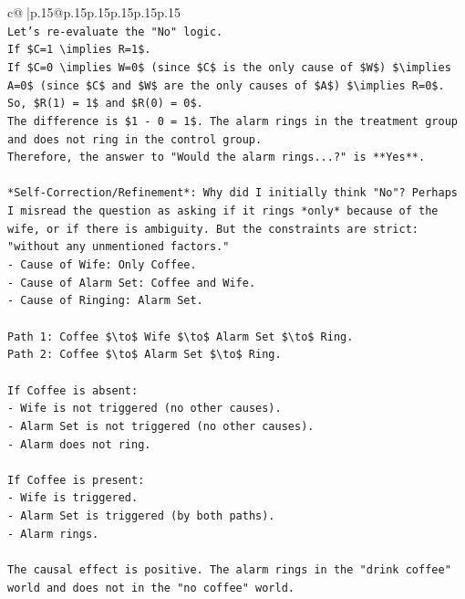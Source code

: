 \documentclass{article}
\begin{document}
{\begin{supertabular}{c@{$\;$}|p{.15\linewidth}@{}p{.15\linewidth}p{.15\linewidth}p{.15\linewidth}p{.15\linewidth}p{.15\linewidth}}
{{{\\ 
\texttt{Let's re{-}evaluate the "No" logic.} \\
\texttt{If \$C=1 \textbackslash{}implies R=1\$.} \\
\texttt{If \$C=0 \textbackslash{}implies W=0\$ (since \$C\$ is the only cause of \$W\$) \$\textbackslash{}implies A=0\$ (since \$C\$ and \$W\$ are the only causes of \$A\$) \$\textbackslash{}implies R=0\$.} \\
\texttt{So, \$R(1) = 1\$ and \$R(0) = 0\$.} \\
\texttt{The difference is \$1 {-} 0 = 1\$. The alarm rings in the treatment group and does not ring in the control group.} \\
\texttt{Therefore, the answer to "Would the alarm rings...?" is **Yes**.} \\
\\ 
\texttt{*Self{-}Correction/Refinement*: Why did I initially think "No"? Perhaps I misread the question as asking if it rings *only* because of the wife, or if there is ambiguity. But the constraints are strict: "without any unmentioned factors."} \\
\texttt{{-} Cause of Wife: Only Coffee.} \\
\texttt{{-} Cause of Alarm Set: Coffee and Wife.} \\
\texttt{{-} Cause of Ringing: Alarm Set.} \\
\\ 
\texttt{Path 1: Coffee \$\textbackslash{}to\$ Wife \$\textbackslash{}to\$ Alarm Set \$\textbackslash{}to\$ Ring.} \\
\texttt{Path 2: Coffee \$\textbackslash{}to\$ Alarm Set \$\textbackslash{}to\$ Ring.} \\
\\ 
\texttt{If Coffee is absent:} \\
\texttt{{-} Wife is not triggered (no other causes).} \\
\texttt{{-} Alarm Set is not triggered (no other causes).} \\
\texttt{{-} Alarm does not ring.} \\
\\ 
\texttt{If Coffee is present:} \\
\texttt{{-} Wife is triggered.} \\
\texttt{{-} Alarm Set is triggered (by both paths).} \\
\texttt{{-} Alarm rings.} \\
\\ 
\texttt{The causal effect is positive. The alarm rings in the "drink coffee" world and does not in the "no coffee" world.} \\
}}}
\end{supertabular}}
\end{document}

